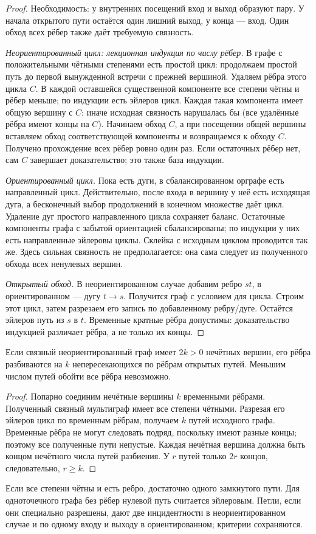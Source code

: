\begin{proof}
Необходимость: у внутренних посещений вход и выход образуют пару.
У начала открытого пути остаётся один лишний выход, у конца — вход.
Один обход всех рёбер также даёт требуемую связность.

\textit{Неориентированный цикл: лекционная индукция по числу рёбер.}
В графе с положительными чётными степенями есть простой цикл:
продолжаем простой путь до первой вынужденной встречи с прежней вершиной.
Удаляем рёбра этого цикла \(C\). В каждой оставшейся существенной
компоненте все степени чётны и рёбер меньше; по индукции есть эйлеров
цикл. Каждая такая компонента имеет общую вершину с \(C\): иначе исходная
связность нарушалась бы (все удалённые рёбра имеют концы на \(C\)).
Начинаем обход \(C\), а при посещении общей вершины вставляем обход
соответствующей компоненты и возвращаемся к обходу \(C\).
Получено прохождение всех рёбер ровно один раз. Если остаточных рёбер нет,
сам \(C\) завершает доказательство; это также база индукции.



\textit{Ориентированный цикл.} Пока есть дуги, в сбалансированном орграфе
есть направленный цикл. Действительно, после входа в вершину у неё есть
исходящая дуга, а бесконечный выбор продолжений в конечном множестве
даёт цикл. Удаление дуг простого направленного цикла сохраняет баланс.
Остаточные компоненты графа с забытой ориентацией сбалансированы;
по индукции у них есть направленные эйлеровы циклы. Склейка с исходным
циклом проводится так же. Здесь сильная связность не предполагается:
она сама следует из полученного обхода всех ненулевых вершин.

\textit{Открытый обход.} В неориентированном случае добавим ребро \(st\),
в ориентированном — дугу \(t\to s\). Получится граф с условием для цикла.
Строим этот цикл, затем разрезаем его запись по добавленному ребру/дуге.
Остаётся эйлеров путь из \(s\) в \(t\). Временные кратные рёбра допустимы:
доказательство индукцией различает рёбра, а не только их концы.
\end{proof}


\begin{cor}
Если связный неориентированный граф имеет \(2k>0\) нечётных вершин,
его рёбра разбиваются на \(k\) непересекающихся по рёбрам открытых путей.
Меньшим числом путей обойти все рёбра невозможно.
\end{cor}
\begin{proof}
Попарно соединим нечётные вершины \(k\) временными рёбрами.
Полученный связный мультиграф имеет все степени чётными. Разрезая его
эйлеров цикл по временным рёбрам, получаем \(k\) путей исходного графа.
Временные рёбра не могут следовать подряд, поскольку имеют разные концы;
поэтому все полученные пути непустые. Каждая нечётная вершина должна
быть концом нечётного числа путей разбиения. У \(r\) путей только \(2r\)
концов, следовательно, \(r\ge k\).
\end{proof}
Если все степени чётны и есть ребро, достаточно одного замкнутого пути.
Для одноточечного графа без рёбер нулевой путь считается эйлеровым.
Петли, если они специально разрешены, дают две инцидентности в неориентированном
случае и по одному входу и выходу в ориентированном; критерии сохраняются.

